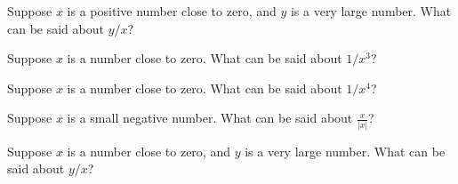 \documentclass{ximera}
\newcommand{\recommendation}[1]{}
\begin{document}


\begin{problem}
  Suppose $x$ is a positive number close to zero, and $y$ is a very large number.  What can be said about $y/x$?
  \begin{multipleChoice}
  \end{multipleChoice}
\end{problem}

\begin{problem}
  Suppose $x$ is a number close to zero.  What can be said about $1/x^3$?
  \begin{multipleChoice}
  \end{multipleChoice}
\end{problem}

\begin{problem}
  Suppose $x$ is a number close to zero.  What can be said about $1/x^4$?
  \begin{multipleChoice}
  \end{multipleChoice}
\end{problem}

\begin{problem}
	Suppose $x$ is a small negative number.  What can be said about $\frac{x}{|x|}$?
	\begin{multipleChoice}
	\end{multipleChoice}
\end{problem}

\begin{problem}
  Suppose $x$ is a number close to zero, and $y$ is a very large number.  What can be said about $y/x$?
  \begin{multipleChoice}
  \end{multipleChoice}
\end{problem}
\end{document}
